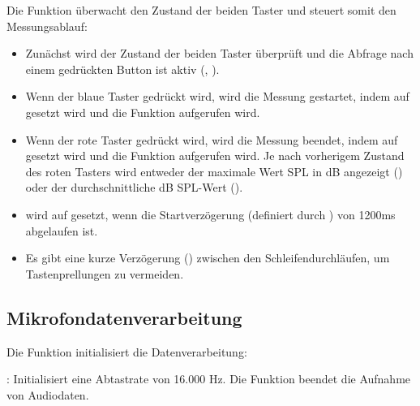 Die Funktion  überwacht den Zustand der beiden Taster und steuert somit den Messungsablauf:

{
    \label{Code:OLED:Monitoring}
}


\begin{itemize}
    \item Zunächst wird der Zustand der beiden Taster überprüft und die Abfrage nach einem gedrückten Button ist aktiv (, ).
    \item Wenn der blaue Taster gedrückt wird, wird die Messung gestartet, indem  auf  gesetzt wird und die Funktion  aufgerufen wird.
    \item Wenn der rote Taster gedrückt wird, wird die Messung beendet, indem  auf  gesetzt wird und die Funktion  aufgerufen wird. Je nach vorherigem Zustand des roten Tasters wird entweder der maximale Wert SPL in dB angezeigt () oder der durchschnittliche dB SPL-Wert ().
    \item {} wird auf  gesetzt, wenn die Startverzögerung (definiert durch ) von 1200ms abgelaufen ist.
    \item Es gibt eine kurze Verzögerung () zwischen den Schleifendurchläufen, um Tastenprellungen zu vermeiden.
\end{itemize} 

\subsection{Mikrofondatenverarbeitung}
Die Funktion  initialisiert die Datenverarbeitung:

{
    \label{Code:Mirco:StartSampling}
}

: Initialisiert eine Abtastrate von 16.000 Hz.
Die Funktion  beendet die Aufnahme von Audiodaten.


